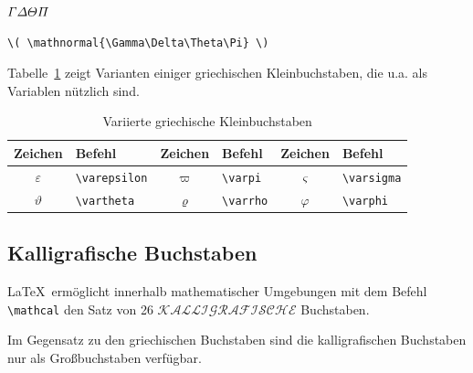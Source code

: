 \documentclass[a4paper,10pt,twoside]{scrbook}
\begin{document}
{\begin{minipage}[c]{.4\textwidth}
\setlength{\parskip}{1em}
\centering
\( \mathnormal{\Gamma\Delta\Theta\Pi} \)
\end{minipage}
\hfill
\begin{minipage}[c]{.58\textwidth}
\setlength{\parskip}{1em}
\begin{lstlisting}[label=mathnormalbeispiel, style=customlatex]
\( \mathnormal{\Gamma\Delta\Theta\Pi} \)
\end{lstlisting}
\end{minipage}

Tabelle~\ref{Tabelle_Griechische_Buchstaben3} zeigt Varianten einiger 
griechischen Kleinbuchstaben, die u.a. als Variablen nützlich sind.


\begin{table}[h!tb]
\centering
\caption{Variierte griechische Kleinbuchstaben}
\label{Tabelle_Griechische_Buchstaben3}       %
\begin{tabular}{clclcl}
\hline
Zeichen & Befehl & Zeichen & Befehl & Zeichen & Befehl \\
\hline
$\varepsilon$ & \texttt{\textbackslash varepsilon} &
$\varpi$ & \texttt{\textbackslash varpi} &
$\varsigma$ & \texttt{\textbackslash varsigma}\\
$\vartheta$ & \texttt{\textbackslash vartheta} &
$\varrho$ & \texttt{\textbackslash varrho} &
$\varphi$ & \texttt{\textbackslash varphi} \\
\hline
\end{tabular}
\end{table}


\subsection{Kalligrafische Buchstaben}

\LaTeX\ ermöglicht innerhalb mathematischer Umgebungen mit dem 
Befehl \verb!\mathcal!
den Satz von 26 $\mathcal{KALLIGRAFISCHE}$ Buchstaben. 


Im Gegensatz zu den griechischen
Buchstaben sind die kalligrafischen Buchstaben nur als Großbuchstaben verfügbar.

}
\end{document}
